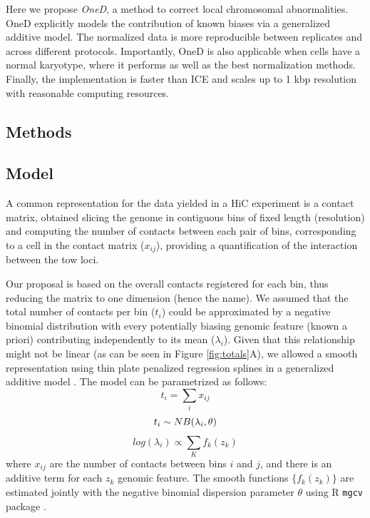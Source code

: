 \documentclass{bioinfo}
\begin{document}
Here we propose \textit{OneD}, a method to correct local chromosomal
abnormalities. OneD explicitly models the contribution of known biases via
a generalized additive model. The normalized data is more reproducible
between replicates and across different protocols. Importantly, OneD is
also applicable when cells have a normal karyotype, where it performs as
well as the best normalization methods. Finally, the implementation is
faster than ICE and scales up to 1 kbp resolution with reasonable
computing resources.


\begin{methods}

\section{Methods}

\subsection{Model}

A common representation for the data yielded in a HiC experiment is a contact matrix, obtained slicing the genome in contiguous bins of fixed length (resolution) and computing the number of contacts between each pair of bins, corresponding to a cell in the contact matrix ($x_{ij}$), providing a quantification of the interaction between the tow loci.

Our proposal is based on the overall contacts registered for each bin, thus reducing the matrix to one dimension (hence the name). We assumed that the total number of contacts per bin ($t_{i}$) could be approximated by a negative binomial distribution with every potentially biasing genomic feature (known a priori) contributing independently to its mean ($\lambda_i$). Given that this relationship might not be linear (as can be seen in Figure \ref{fig:totals}A), we allowed a smooth representation using thin plate penalized regression splines \citep{wood2003thin} in a generalized additive model \citep{wood2011fast}. The model can be parametrized as follows:
$$
t_i = \sum_{i}{x_{ij}}
$$
$$
t_i \sim NB(\lambda_i, \theta) \\
$$
$$
log(\lambda_i) \propto \sum_{K}{f_k(z_k)}
$$
where $x_{ij}$ are the number of contacts between bins $i$ and $j$, and there is an additive term for each $z_k$ genomic feature. The smooth functions $\{f_k(z_k)\}$ are estimated jointly with the negative binomial dispersion parameter $\theta$ using R \citep{coreteam2014r} \texttt{mgcv} package \citep{wood2011fast}.%


\end{methods}
\end{document}
